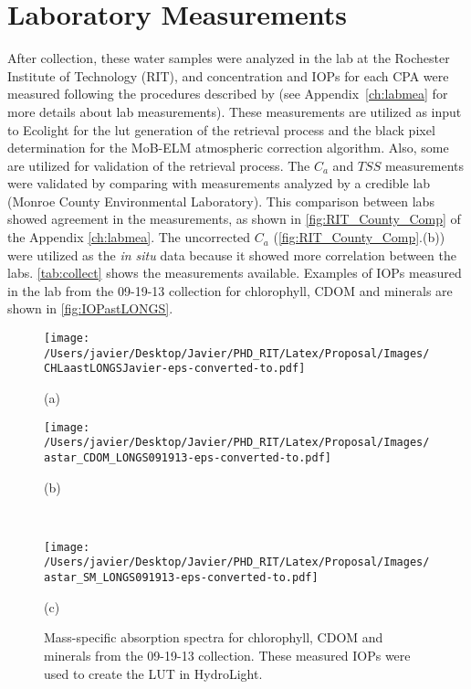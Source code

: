 \section{Laboratory Measurements}
After collection, these water samples were analyzed in the lab at the Rochester Institute of Technology (RIT), and concentration and IOPs for each CPA were measured following the procedures described by \citet{Mueller1995} (see Appendix~\ref{ch:labmea} for more details about lab measurements). These measurements are utilized as input to Ecolight for the \gls{lut} generation of the retrieval process and the black pixel determination for the MoB-ELM atmospheric correction algorithm. Also, some are utilized for validation of the retrieval process. The $C_a$ and $TSS$ measurements were validated by comparing with measurements analyzed by a credible lab (Monroe County Environmental Laboratory). This comparison between labs showed agreement in the measurements, as shown in \autoref{fig:RIT_County_Comp} of the Appendix \ref{ch:labmea}. The uncorrected $C_a$ (\autoref{fig:RIT_County_Comp}.(b)) were utilized as the {\it in situ} data because it showed more correlation between the labs. \autoref{tab:collect} shows the measurements available. Examples of IOPs measured in the lab from the 09-19-13 collection for chlorophyll, CDOM and minerals are shown in \autoref{fig:IOPastLONGS}.

\begin{figure}[htb!]
    \begin{minipage}[c]{0.48\linewidth}
      \centering
    \texttt{[image: /Users/javier/Desktop/Javier/PHD\_RIT/Latex/Proposal/Images/CHLaastLONGSJavier-eps-converted-to.pdf]}
     \centerline{(a)}\medskip
    \end{minipage}
    \hfill
    \begin{minipage}[d]{0.48\linewidth}
      \centering
    \texttt{[image: /Users/javier/Desktop/Javier/PHD\_RIT/Latex/Proposal/Images/astar\_CDOM\_LONGS091913-eps-converted-to.pdf]}
     \centerline{(b)}\medskip
    \end{minipage}\\
    
    \begin{minipage}[d]{1.0\linewidth}
      \centering
    \texttt{[image: /Users/javier/Desktop/Javier/PHD\_RIT/Latex/Proposal/Images/astar\_SM\_LONGS091913-eps-converted-to.pdf]}
      \centerline{(c)}\medskip
    \end{minipage}
  \caption[Mass-specific absorption spectra for chlorophyll, CDOM and minerals from the 09-19-13 collection.]{Mass-specific absorption spectra for chlorophyll, CDOM and minerals from the 09-19-13 collection. These measured IOPs were used to create the LUT in HydroLight. \label{fig:IOPastLONGS} }  
\end{figure}

